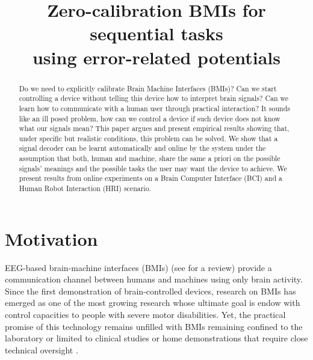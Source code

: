 \documentclass[conference]{IEEEtran}
\begin{document}
\title{Zero-calibration BMIs for sequential tasks\\using error-related potentials}

\author{
}

\maketitle

\begin{abstract}
Do we need to explicitly calibrate Brain Machine Interfaces (BMIs)? Can we start controlling a device without telling this device how to interpret brain signals? Can we learn how to communicate with a human user through practical interaction? It sounds like an ill posed problem, how can we control a device if such device does not know what our signals mean? This paper argues and present empirical results showing that, under specific but realistic conditions, this problem can be solved. We show that a signal decoder can be learnt automatically and online by the system under the assumption that both, human and machine, share the same a priori on the possible signals' meanings and the possible tasks the user may want the device to achieve. We present results from online experiments on a Brain Computer Interface (BCI) and a Human Robot Interaction (HRI) scenario.
\end{abstract}

\section{Motivation}
EEG-based brain-machine interfaces (BMIs) (see \cite{millan10} for a review) provide a communication channel between humans and machines using only brain activity. Since the first demonstration of brain-controlled devices, research on BMIs has emerged as one of the most growing research whose ultimate goal is endow with control capacities to people with severe motor disabilities. Yet, the practical promise of this technology remains unfilled with BMIs remaining confined to the laboratory or limited to clinical studies or home demonstrations that require close technical oversight \cite{sellers2010brain, lebedev2006brain}.
\end{document}
